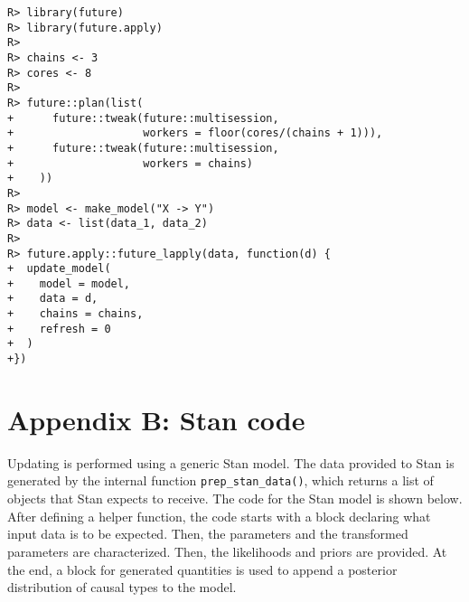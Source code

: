 \documentclass[
  11pt,
  article]{jss}
\begin{document}
\begin{verbatim}
R> library(future)
R> library(future.apply)
R> 
R> chains <- 3
R> cores <- 8
R> 
R> future::plan(list(
+      future::tweak(future::multisession, 
+                    workers = floor(cores/(chains + 1))),
+      future::tweak(future::multisession, 
+                    workers = chains)
+    ))
R> 
R> model <- make_model("X -> Y")
R> data <- list(data_1, data_2)
R> 
R> future.apply::future_lapply(data, function(d) {
+  update_model(
+    model = model,
+    data = d,
+    chains = chains,
+    refresh = 0
+  )
+})
\end{verbatim}

\section*{Appendix B: Stan code}\label{sec-stancode}

Updating is performed using a generic Stan model. The data provided to
Stan is generated by the internal function \texttt{prep\_stan\_data()},
which returns a list of objects that Stan expects to receive. The code
for the Stan model is shown below. After defining a helper function, the
code starts with a block declaring what input data is to be expected.
Then, the parameters and the transformed parameters are characterized.
Then, the likelihoods and priors are provided. At the end, a block for
generated quantities is used to append a posterior distribution of
causal types to the model.
\end{document}
